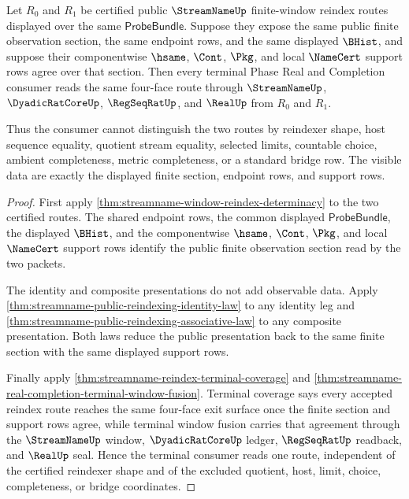 \begin{theorem}
\label{thm:streamname-public-reindexing-section-cancellation}
Let $R_0$ and $R_1$ be certified public $\StreamNameUp$ finite-window reindex
routes displayed over the same $\mathsf{ProbeBundle}$. Suppose they expose the
same public finite observation section, the same endpoint rows, and the same
displayed $\BHist$, and suppose their componentwise $\hsame$, $\Cont$, $\Pkg$,
and local $\NameCert$ support rows agree over that section. Then every terminal
Phase Real and Completion consumer reads the same four-face route through
$\StreamNameUp$, $\DyadicRatCoreUp$, $\RegSeqRatUp$, and $\RealUp$ from $R_0$
and $R_1$.

Thus the consumer cannot distinguish the two routes by reindexer shape, host
sequence equality, quotient stream equality, selected limits, countable choice,
ambient completeness, metric completeness, or a standard bridge row. The
visible data are exactly the displayed finite section, endpoint rows, and
support rows.
\end{theorem}
\begin{proof}
First apply \autoref{thm:streamname-window-reindex-determinacy} to the two
certified routes. The shared endpoint rows, the common displayed
$\mathsf{ProbeBundle}$, the displayed $\BHist$, and the componentwise
$\hsame$, $\Cont$, $\Pkg$, and local $\NameCert$ support rows identify the
public finite observation section read by the two packets.

The identity and composite presentations do not add observable data. Apply
\autoref{thm:streamname-public-reindexing-identity-law} to any identity leg
and \autoref{thm:streamname-public-reindexing-associative-law} to any
composite presentation. Both laws reduce the public presentation back to the
same finite section with the same displayed support rows.

Finally apply \autoref{thm:streamname-reindex-terminal-coverage} and
\autoref{thm:streamname-real-completion-terminal-window-fusion}. Terminal
coverage says every accepted reindex route reaches the same four-face exit
surface once the finite section and support rows agree, while terminal window
fusion carries that agreement through the $\StreamNameUp$ window,
$\DyadicRatCoreUp$ ledger, $\RegSeqRatUp$ readback, and $\RealUp$ seal. Hence
the terminal consumer reads one route, independent of the certified reindexer
shape and of the excluded quotient, host, limit, choice, completeness, or
bridge coordinates.
\end{proof}

